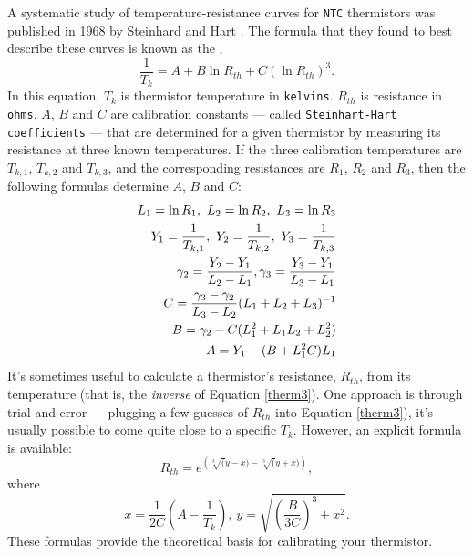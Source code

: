 A systematic study of temperature-resistance curves for \texttt{NTC} thermistors was published in 1968 by Steinhard and Hart \cite{STEINHART1968497}.
The formula that they found to best describe these curves is known as the ,
\begin{equation}\label{therm3}
\frac{1}{T_{k}} = A + B \ln R_{th} + C (\ln R_{th})^3.
\end{equation}
In this equation, $T_{k}$ is thermistor temperature in \texttt{kelvins}.
$R_{th}$ is resistance in \texttt{ohms}.
$A$, $B$ and $C$ are calibration constants --- called \texttt{Steinhart-Hart coefficients} ---  that are determined for a given thermistor by measuring its resistance at three known temperatures.
If the three calibration temperatures are $T_{k,1}$, $T_{k,2}$ and $T_{k,3}$, and the corresponding resistances are $R_1$, $R_2$ and $R_3$, then the following formulas determine $A$, $B$ and $C$:
\begin{eqnarray}
L_1 = \ln R_1, ~L_2 = \ln R_2, ~L_3 = \ln R_3  \nonumber \\
Y_1 = \frac{1}{T_{k,1}}, ~Y_2 = \frac{1}{T_{k,2}}, ~Y_3 = \frac{1}{T_{k,3}} \nonumber \\
\gamma_2 = \frac{Y_2-Y_1}{L_2-L_1}, \gamma_3 = \frac{Y_3-Y_1}{L_3-L_1} \nonumber \\
C = \frac{\gamma_3-\gamma_2}{L_3-L_2} (L_1+L_2+L_3)^{-1}  \label{therm4}\\
B = \gamma_2 - C(L_1^2 + L_1 L_2 + L_2^2) \nonumber \\
A = Y_1 - (B+L_1^2 C) L_1 \nonumber
\end{eqnarray}
It's sometimes useful to calculate a thermistor's resistance, $R_{th}$, from its temperature (that is, the \emph{inverse} of Equation \ref{therm3}).
One approach is through trial and error --- plugging a few guesses of $R_{th}$ into Equation \ref{therm3}), it's usually possible to come quite close to a specific $T_k$.
However, an explicit formula is available:
\begin{equation}\label{therm5}
R_{th} = e^{\left(\sqrt[3](y-x) - \sqrt[3](y+x)\right)} ,
\end{equation}
where
\begin{equation}\label{therm6}
x = \frac{1}{2C} \left( A - \frac{1}{T_{k}} \right), ~ y = \sqrt{\left(\frac{B}{3C}\right)^3+x^2}.
\end{equation}
These formulas provide the theoretical basis for calibrating your thermistor.

